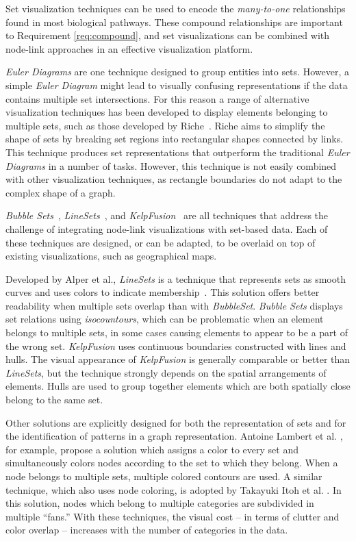 \documentclass[review,journal]{vgtc}         %
\newcounter{task}
\begin{document}
Set visualization techniques can be used to encode the \emph{many-to-one} relationships found in most biological pathways. These compound relationships are important to Requirement \ref{req:compound}, and set visualizations can be combined with node-link approaches in an effective visualization platform.

\emph{Euler Diagrams} are one technique designed to group entities into sets. However, a simple \emph{Euler Diagram} might lead to visually confusing representations if the data contains multiple set intersections. For this reason a range of alternative visualization techniques has been developed to display elements belonging to multiple sets, such as those developed by Riche~\cite{riche2010untangling}. Riche aims to simplify the shape of sets by breaking set regions into rectangular shapes connected by links. This technique produces set representations that outperform the traditional \textit{Euler Diagrams} in a number of tasks. However, this technique is not easily combined with other visualization techniques, as rectangle boundaries do not adapt to the complex shape of a graph. 

\textit{Bubble Sets}~\cite{collins2009bubble}, \textit{LineSets}~\cite{linesets}, and \textit{KelpFusion}~\cite{meulemans2013kelpfusion} are all techniques that address the challenge of integrating node-link visualizations with set-based data. Each of these techniques are designed, or can be adapted, to be overlaid on top of existing visualizations, such as geographical maps.   

Developed by Alper et al., \textit{LineSets} is a technique that represents sets as smooth curves and uses colors to indicate membership~\cite{linesets}. This solution offers better readability when multiple sets overlap than with \textit{BubbleSet}. \textit{Bubble Sets} displays set relations using \emph{isocountours}, which can be problematic when an element belongs to multiple sets, in some cases causing elements to appear to be a part of the wrong set. \textit{KelpFusion} uses continuous boundaries constructed with lines and hulls. The visual appearance of \emph{KelpFusion} is generally comparable or better than \textit{LineSets}, but the technique strongly depends on the spatial arrangements of elements. Hulls are used to group together elements which are both spatially close belong to the same set.

Other solutions are explicitly designed for both the representation of sets and for the identification of patterns in a graph representation. Antoine Lambert et al. \cite{lambert2012visualizing}, for example, propose a solution which assigns a color to every set and simultaneously colors nodes according to the set to which they belong. When a node belongs to multiple sets, multiple colored contours are used. A similar technique, which also uses node coloring, is adopted by Takayuki Itoh et al. \cite{itoh2009hybrid}. In this solution, nodes which belong to multiple categories are subdivided in multiple ``fans.'' With these techniques, the visual cost -- in terms of clutter and color overlap -- increases with the number of categories in the data.
\end{document}
